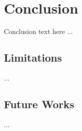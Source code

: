 \chapter{Conclusion}
Conclusion text here ...

\section{Limitations}
...
\section{Future Works}
...










